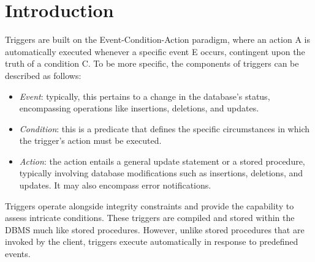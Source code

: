 \section{Introduction}

Triggers are built on the Event-Condition-Action paradigm, where an action A is automatically executed whenever a specific event E occurs, contingent upon the truth of a condition C.
To be more specific, the components of triggers can be described as follows:
\begin{itemize}
    \item \textit{Event}: typically, this pertains to a change in the database's status, encompassing operations like insertions, deletions, and updates.
    \item \textit{Condition}: this is a predicate that defines the specific circumstances in which the trigger's action must be executed.
    \item \textit{Action}: the action entails a general update statement or a stored procedure, typically involving database modifications such as insertions, deletions, and updates. 
        It may also encompass error notifications.
\end{itemize}

Triggers operate alongside integrity constraints and provide the capability to assess intricate conditions. 
These triggers are compiled and stored within the DBMS much like stored procedures. 
However, unlike stored procedures that are invoked by the client, triggers execute automatically in response to predefined events.
